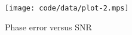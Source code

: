 \documentclass[journal]{IEEEtran}
\begin{document}
 \begin{figure}[htbp]
 	\centering
 		\texttt{[image: code/data/plot-2.mps]}
 		\caption{Phase error versus SNR}
 		\label{fig:plotphaseBPSK}
 \end{figure}













\small




 
\end{document}
